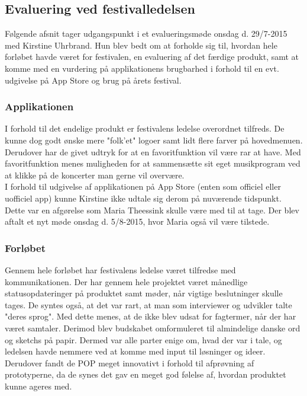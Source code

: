 \documentclass[a4paper,10pt,titlepage]{article}
\begin{document}
\subsection{Evaluering ved festivalledelsen}
Følgende afsnit tager udgangspunkt i et evalueringsmøde onsdag d. 29/7-2015 med Kirstine Uhrbrand. Hun blev bedt om at forholde sig til, hvordan hele forløbet havde været for festivalen, en evaluering af det færdige produkt, samt at komme med en vurdering på applikationens brugbarhed i forhold til en evt. udgivelse på App Store og brug på årets festival.
\subsubsection{Applikationen}
I forhold til det endelige produkt er festivalens ledelse overordnet tilfreds. De kunne dog godt ønske mere "folk'et" logoer samt lidt flere farver på hovedmenuen. Derudover har de givet udtryk for at en favoritfunktion vil være rar at have. Med favoritfunktion menes muligheden for at sammensætte sit eget musikprogram ved at klikke på de koncerter man gerne vil overvære.\\
I forhold til udgivelse af applikationen på App Store (enten som officiel eller uofficiel app) kunne Kirstine ikke udtale sig derom på nuværende tidspunkt. Dette var en afgørelse som Maria Theessink skulle være med til at tage. Der blev aftalt et nyt møde onsdag d. 5/8-2015, hvor Maria også vil være tilstede. 
\subsubsection{Forløbet}
Gennem hele forløbet har festivalens ledelse været tilfredse med kommunikationen. Der har gennem hele projektet været månedlige statusopdateringer på produktet samt møder, når vigtige beslutninger skulle tages. De syntes også, at det var rart, at man som interviewer og udvikler talte "deres sprog". Med dette menes, at de ikke blev udsat for fagtermer, når der har været samtaler. Derimod blev budskabet omformuleret til almindelige danske ord og sketchs på papir. Dermed var alle parter enige om, hvad der var i tale, og ledelsen havde nemmere ved at komme med input til løsninger og ideer.
Derudover fandt de POP meget innovativt i forhold til afprøvning af prototyperne, da de synes det gav en meget god følelse af, hvordan produktet kunne ageres med.
\end{document}
